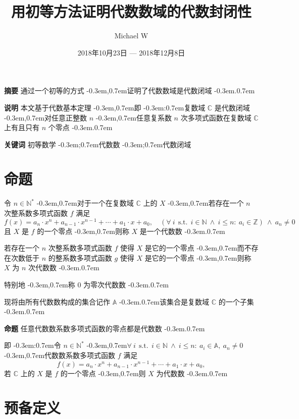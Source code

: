 \documentclass{article}
\title{用初等方法证明代数数域的代数封闭性}
\author{Michael W}
\date{2018年10月23日 --- 2018年12月8日}
\newcommand\InSetA[1]{\InSet{#1}{\MathSetA}}
\newcommand\InSetN[1]{\InSet{#1}{\MathSetN}}
\newcommand\InSetU[1]{\InSet{#1}{\MathSetU}}
\newcommand\InSetZ[1]{\InSet{#1}{\MathSetZ}}
\newcommand\MathSetA{\mathbb{A}}
\newcommand\MathSetC{\mathbb{C}}
\newcommand\MathSetN{\mathbb{N}}
\newcommand\MathSetU{\mathbb{N}^{\ast}}
\newcommand\MathSetZ{\mathbb{Z}}
\newcommand\Bracket[1]{\left( #1 \right)}
\newcommand\Colon{:}
\newcommand\Comma{,}
\newcommand\CommaAnd{\Space{\Comma}}
\newcommand\Domain[1]{\DomainComma \quad #1}
\newcommand\DomainAnd{\LogicAnd}
\newcommand\DomainComma{\Comma}
\newcommand\FlatPolynomial{a_{n} \cdot x^{n} + a_{n-1} \cdot x^{n-1} + \cdots + a_{1} \cdot x + a_{0}}
\newcommand\ForAll[3]{\Satisfy{\forall}{#1}{#2}{#3}}
\newcommand\Func[2]{#1 \Bracket{#2}}
\newcommand\InSet[2]{#1 \in #2}
\newcommand\Logic[1]{\ #1\ }
\newcommand\LogicAnd{\Logic{\wedge}}
\newcommand\NeqZero[1]{#1 \neq 0}
\newcommand\Satisfy[4]{\Space{#1} #2 \SuchThat #3 \Space{\Colon} #4}
\newcommand\Space[1]{#1\ }
\newcommand\SuchThat{\Logic{\Logic{\text{s.t.}}}}
\newcommand\EqEndComma{\Comma}
\newcommand\SubTitle[1]{\textbf{#1} \quad}
\newcommand\TextColon{\TextPunctuation{\Colon}}
\newcommand\TextComma{\TextPunctuation{\Comma}}
\newcommand\TextPeriod{\TextPunctuation{.}}
\newcommand\TextPunctuation[1]{\kern -0.3em#1\kern 0.7em}
\newcommand\TextSemicolon{\TextPunctuation{;}}
\begin{document}
	
	\maketitle
	
	\SubTitle{摘要} 通过一个初等的方式 \TextComma 证明了代数数域是代数闭域 \TextPeriod
	
	\SubTitle{说明} 本文基于代数基本定理 \TextComma 即 \TextColon 复数域 $\MathSetC$ 是代数闭域 \TextComma 对任意正整数 $n$ \TextComma 任意复系数 $n$ 次多项式函数在复数域 $\MathSetC$ 上有且只有 $n$ 个零点 \TextPeriod
	
	\SubTitle{关键词} 初等数学 \TextSemicolon 代数数 \TextSemicolon 代数闭域
	
	
	\section{命题}
	令 $\InSetU{n}$ \TextComma 对于一个在复数域 $\MathSetC$ 上的 $X$ \TextComma 若存在一个 $n$ 次整系数多项式函数 $f$ 满足
	\begin{equation*}
	\Func{f}{x} = \FlatPolynomial \Domain{\Bracket{\ForAll{i}{\InSetN{i} \LogicAnd i \leq n}{\InSetZ{a_{i}}}} \DomainAnd \NeqZero{a_{n}}}
	\end{equation*}
	且 $X$ 是 $f$ 的一个零点 \TextComma 则称 $X$ 是一个代数数 \TextPeriod
	
	若存在一个 $n$ 次整系数多项式函数 $f$ 使得 $X$ 是它的一个零点 \TextComma 而不存在次数低于 $n$ 的整系数多项式函数 $g$ 使得 $X$ 是它的一个零点 \TextComma 则称 $X$ 为 $n$ 次代数数 \TextPeriod
	
	特别地 \TextComma 称 $0$ 为零次代数数 \TextPeriod
	
	现将由所有代数数构成的集合记作 $\MathSetA$ \TextPeriod 该集合是复数域 $\MathSetC$ 的一个子集 \TextPeriod
	
	\SubTitle{命题} 任意代数数系数多项式函数的零点都是代数数 \TextPeriod
	
	即 \TextColon 令 $\InSetU{n}$ \TextComma $\ForAll{i}{\InSetN{i} \LogicAnd i \leq n}{\InSetA{a_{i}}} \CommaAnd \NeqZero{a_{n}}$ \TextComma 代数数系数多项式函数 $f$ 满足
	\begin{equation*}
	\Func{f}{x} = \FlatPolynomial \EqEndComma
	\end{equation*}
	若 $\MathSetC$ 上的 $X$ 是 $f$ 的一个零点 \TextComma 则 $X$ 为代数数 \TextPeriod
	
	
	\section{预备定义}
\end{document}
